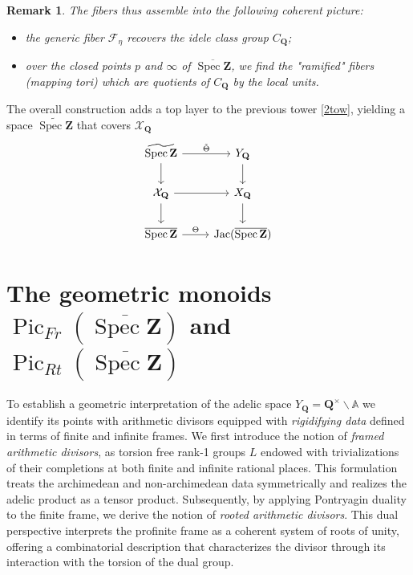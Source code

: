 \documentclass[11pt,a4paper]{article}
\newcommand{\Q}{\mathbf{Q}}
\newcommand{\Z}{\mathbf{Z}}
\newcommand{\A}{\mathbb{A}}
\def\spz{\Spec \Z}
\def\spzb{\overline{\Spec \Z}}
\newcommand{\Spec}{\operatorname{Spec}}
\def\Jac{\operatorname{Jac}}
\def\spz{\Spec \Z}
\def\MFr{\operatorname{Pic}_{Fr}}
\def\MRt{\operatorname{Pic}_{Rt}}
\theoremstyle{plain}
\newtheorem{rem}[thm]{Remark}
\theoremstyle{definition} %
\begin{document}
\begin{rem}
The fibers thus assemble into the following  coherent picture:
\begin{itemize}[leftmargin=*, labelindent=0pt]
  \item the generic fiber $\mathcal F_\eta$ recovers the idele class group $C_\Q$;
  \item over the closed points $p$ and $\infty$ of $\spzb$, we find the "ramified" fibers (mapping tori) which are quotients of $C_\Q$ by the local units.
\end{itemize}
\end{rem}

The overall construction adds a top layer to the previous tower \eqref{2tow}, yielding a space $\widetilde{\spz}$ that covers $\mathcal{X}_\Q$
\begin{equation}\label{3floorb}
\begin{tikzcd}
\widetilde{\spz} \arrow[r,"\tilde\Theta"]\arrow[d] & Y_\Q\arrow[d]
\\
\mathcal{X}_\Q \arrow[r] \arrow[d] & X_\Q \arrow[d] \\
\spzb \arrow[r, "\Theta"] & \Jac(\spzb)
\end{tikzcd}
\end{equation}





\section{The geometric  monoids $\MFr(\spzb)$ and $\MRt(\spzb)$}\label{sectgeompic}

To establish a geometric interpretation of the adelic space $Y_\Q = \Q^\times \backslash \A$ we identify its points with arithmetic divisors equipped with \emph{rigidifying data} defined in terms of finite and infinite frames. We first introduce the notion of \emph{framed arithmetic divisors},  as torsion free rank-1 groups $L$ endowed with trivializations of their completions at both finite and infinite rational places. This formulation treats the archimedean and non-archimedean data symmetrically and realizes the adelic product as a tensor product. Subsequently, by applying Pontryagin duality to the finite frame, we derive the notion of \emph{rooted arithmetic divisors}. This dual perspective interprets the profinite frame as a coherent system of roots of unity, offering a combinatorial description that characterizes the divisor through its interaction with the torsion of the dual group.
\end{document}
